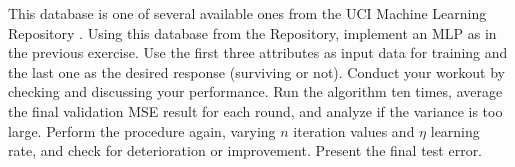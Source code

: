 \begin{enumerate}
This database is one of several available ones from the UCI Machine Learning Repository \cite{Dua:2019}. Using this database from the Repository, implement an MLP as in the previous exercise. Use the first three attributes as input data for training and the last one as the desired response (surviving or not). Conduct your workout by checking and discussing your performance. Run the algorithm ten times, average the final validation MSE result for each round, and analyze if the variance is too large. Perform the procedure again, varying $n$ iteration values and $\eta$ learning rate, and check for deterioration or improvement. Present the final test error.
\end{enumerate}



